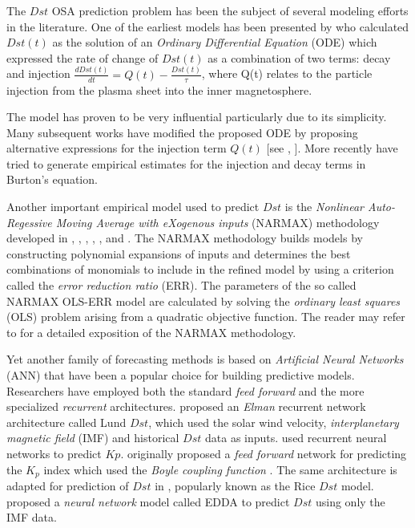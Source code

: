 \documentclass[referee,a4paper,12pt,traditabstract]{swsc}
\begin{document}
\begin{linenumbers}
The $Dst$ OSA prediction problem has been the subject of several modeling efforts in the literature. One of the earliest models has been presented by \citet{JGR:JGR10260} who calculated $Dst(t)$ as the solution of an \emph{Ordinary Differential Equation} (ODE) which expressed the rate of change of $Dst(t)$ as a combination of two terms: decay and injection $\frac{d Dst(t)}{dt} = Q(t) - \frac{Dst(t)}{\tau}$, where Q(t) relates to the particle injection from the plasma sheet into the inner magnetosphere. 

The \citet{JGR:JGR10260} model has proven to be very influential particularly due to its simplicity. Many subsequent works have modified the proposed ODE by proposing alternative expressions for the injection term $Q(t)$ [see \citet{Wang:Dst}, \citet{JGRA:JGRA14856}]. More recently \citet{Ballatore2014} have tried to generate empirical estimates for the injection and decay terms in Burton's equation.

Another important empirical model used to predict $Dst$ is the \emph{Nonlinear Auto-Regessive Moving Average with eXogenous inputs} (NARMAX) methodology developed in \citet{doi:10.1080/00207178908559767}, \citet{GRL:GRL13494}, \citet{GRL:GRL20944}, \citet{JGRA:JGRA18657}, \citet{balikhin:narmax}, \citet{JGRA:JGRA20661} and \citet{JGRA:JGRA50192}. The NARMAX methodology builds models by constructing polynomial expansions of inputs and determines the best combinations of monomials to include in the refined model by using a criterion called the \emph{error reduction ratio} (ERR). The parameters of the so called NARMAX OLS-ERR model are calculated by solving the \emph{ordinary least squares} (OLS) problem arising from a quadratic objective function. The reader may refer to \citet{billings2013nonlinear} for a detailed exposition of the NARMAX methodology.

Yet another family of forecasting methods is based on \emph{Artificial Neural Networks} (ANN) that have been a popular choice for building predictive models. Researchers have employed both the standard \emph{feed forward} and the more specialized \emph{recurrent} architectures. \citet{Lund} proposed an \emph{Elman} recurrent network architecture called Lund $Dst$, which used the solar wind velocity, \emph{interplanetary magnetic field} (IMF) and historical $Dst$ data as inputs. \citet{JGRA:JGRA17461} used recurrent neural networks to predict $Kp$. \citet{SWE:SWE286} originally proposed a \emph{feed forward} network for predicting the $K_p$ index which used the \emph{Boyle coupling function} \citep{boyle1997empirical}. The same architecture is adapted for prediction of $Dst$ in \citet{SWE:SWE286}, popularly known as the Rice $Dst$ model. \citet{pallocchia:hal-00318011} proposed a \emph{neural network} model called EDDA to predict $Dst$ using only the IMF data.


\end{linenumbers}
\end{document}
